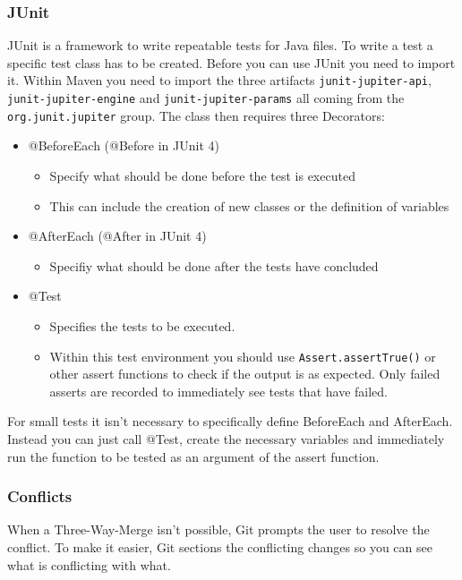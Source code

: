 \documentclass{article}
\begin{document}
 	\subsubsection{JUnit}
 	JUnit is a framework to write repeatable tests for Java files. To write a test a specific test class has to be created. Before you can use JUnit you need to import it. Within Maven you need to import the three artifacts \texttt{junit-jupiter-api}, \texttt{junit-jupiter-engine} and \texttt{junit-jupiter-params} all coming from the \texttt{org.junit.jupiter} group. The class then requires three Decorators:
 	\begin{itemize}
 		\item{@BeforeEach (@Before in JUnit 4)}
 		\begin{itemize}
 			\item{Specify what should be done before the test is executed}
 			\item{This can include the creation of new classes or the definition of variables}
 		\end{itemize}
 		\item{@AfterEach (@After in JUnit 4)}
 		\begin{itemize}
 			\item{Specifiy what should be done after the tests have concluded}
 		\end{itemize}
 		\item{@Test}
 		\begin{itemize}
 			\item{Specifies the tests to be executed.}
 			\item{Within this test environment you should use \texttt{Assert.assertTrue()} or other assert functions to check if the output is as expected. Only failed asserts are recorded to immediately see tests that have failed.}
 		\end{itemize}
 	\end{itemize}
 	For small tests it isn't necessary to specifically define BeforeEach and AfterEach. Instead you can just call @Test, create the necessary variables and immediately run the function to be tested as an argument of the assert function.
\subsubsection{Conflicts}
	When a Three-Way-Merge isn't possible, Git prompts the user to resolve the conflict. To make it easier, Git sections the conflicting changes so you can see what is conflicting with what.
\end{document}
